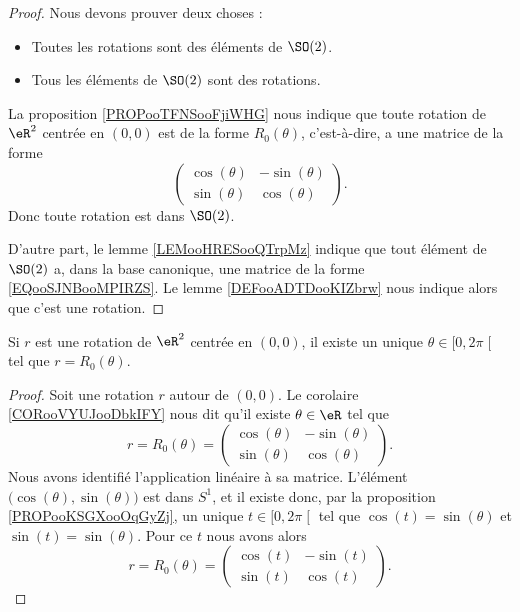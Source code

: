 \begin{proof}
	Nous devons prouver deux choses :
	\begin{itemize}
		\item Toutes les rotations sont des éléments de \( \SO(2)\).
		\item Tous les éléments de \( \SO(2)\) sont des rotations.
	\end{itemize}

	La proposition \ref{PROPooTFNSooFjiWHG} nous indique que toute rotation de \( \eR^2\) centrée en \( (0,0)\) est de la forme \( R_0(\theta)\), c'est-à-dire, a une matrice de la forme
	\begin{equation}        \label{EQooSJNBooMPIRZS}
		\begin{pmatrix}
			\cos(\theta) & -\sin(\theta) \\
			\sin(\theta) & \cos(\theta)
		\end{pmatrix}.
	\end{equation}
	Donc toute rotation est dans \( \SO(2)\).

	D'autre part, le lemme \ref{LEMooHRESooQTrpMz} indique que tout élément de \( \SO(2)\) a, dans la base canonique, une matrice de la forme \eqref{EQooSJNBooMPIRZS}. Le lemme \ref{DEFooADTDooKIZbrw} nous indique alors que c'est une rotation.
\end{proof}

\begin{proposition}         \label{PROPooOTIVooZpvLnb}
	Si \( r\) est une rotation de \( \eR^2\) centrée en \( (0,0)\), il existe un unique \( \theta\in\mathopen[ 0 , 2\pi \mathclose[\) tel que \( r=R_0(\theta)\).
\end{proposition}

\begin{proof}
	Soit une rotation \( r\) autour de \( (0,0)\). Le corolaire \ref{CORooVYUJooDbkIFY} nous dit qu'il existe \( \theta\in \eR\) tel que
	\begin{equation}
		r=R_0(\theta)=\begin{pmatrix}
			\cos(\theta) & -\sin(\theta) \\
			\sin(\theta) & \cos(\theta)
		\end{pmatrix}.
	\end{equation}
	Nous avons identifié l'application linéaire à sa matrice. L'élément \( \big( \cos(\theta), \sin(\theta) \big)\) est dans \( S^1\), et il existe donc, par la proposition \ref{PROPooKSGXooOqGyZj}, un unique \( t\in \mathopen[ 0 , 2\pi \mathclose[\) tel que \( \cos(t)=\sin(\theta)\) et \( \sin(t)=\sin(\theta)\). Pour ce \( t\) nous avons alors
	\begin{equation}
		r=R_0(\theta)=\begin{pmatrix}
			\cos(t) & -\sin(t) \\
			\sin(t) & \cos(t)
		\end{pmatrix}.
	\end{equation}
\end{proof}

